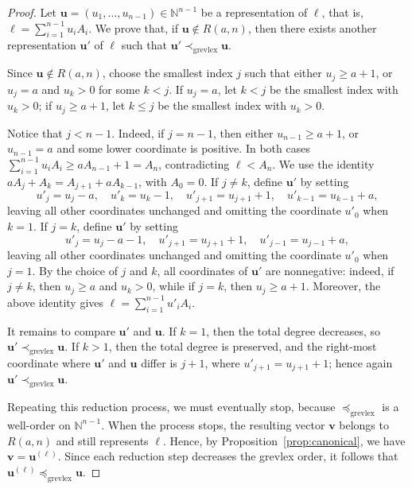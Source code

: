 \documentclass[12pt,a4paper]{amsart}
\theoremstyle{definition}
\begin{document}
\begin{proof}
Let $\mathbf{u}=(u_1,\ldots,u_{n-1})\in\mathbb{N}^{n-1}$ be a representation of $\ell$, that is, $\ell=\sum_{i=1}^{n-1}u_iA_i$. We prove that, if $\mathbf{u}\notin R(a,n)$, then there exists another representation $\mathbf{u}'$ of $\ell$ such that $\mathbf{u}'\prec_{\mathrm{grevlex}}\mathbf{u}$.

Since $\mathbf{u}\notin R(a,n)$, choose the smallest index $j$ such that
either $u_j\ge a+1$, or $u_j=a$ and $u_k>0$ for some $k<j$. If
$u_j=a$, let $k<j$ be the smallest index with $u_k>0$; if
$u_j\ge a+1$, let $k\le j$ be the smallest index with $u_k>0$.

Notice that $j<n-1$. Indeed, if $j=n-1$, then either
$u_{n-1}\ge a+1$, or $u_{n-1}=a$ and some lower coordinate is positive.
In both cases $\sum_{i=1}^{n-1}u_iA_i\ge aA_{n-1}+1=A_n$,
contradicting $\ell<A_n$.
We use the identity $aA_j+A_k=A_{j+1}+aA_{k-1}$, with $A_0=0$. If $j\ne k$, define $\mathbf{u}'$ by setting
\[
u'_j=u_j-a,\quad u'_k=u_k-1,\quad u'_{j+1}=u_{j+1}+1,\quad u'_{k-1}=u_{k-1}+a,
\]
leaving all other coordinates unchanged and omitting the coordinate $u'_0$ when $k=1$. If $j=k$, define $\mathbf{u}'$ by setting
\[
u'_j=u_j-a-1,\quad u'_{j+1}=u_{j+1}+1,\quad u'_{j-1}=u_{j-1}+a,
\]
leaving all other coordinates unchanged and omitting the coordinate $u'_0$ when $j=1$. By the choice of $j$ and $k$, all coordinates of $\mathbf{u}'$ are nonnegative: indeed, if $j\ne k$, then $u_j\ge a$ and $u_k>0$, while if $j=k$, then $u_j\ge a+1$. Moreover, the above identity gives $\ell=\sum_{i=1}^{n-1}u'_iA_i$.

It remains to compare $\mathbf{u}'$ and $\mathbf{u}$. If $k=1$, then the total degree decreases, so $\mathbf{u}'\prec_{\mathrm{grevlex}}\mathbf{u}$. If $k>1$, then the total degree is preserved, and the right-most coordinate where $\mathbf{u}'$ and $\mathbf{u}$ differ is $j+1$, where $u'_{j+1}=u_{j+1}+1$; hence again $\mathbf{u}' \prec_{\mathrm{grevlex}} \mathbf{u}$.

Repeating this reduction process, we must eventually stop, because $\preceq_{\mathrm{grevlex}}$ is a well-order on $\mathbb{N}^{n-1}$. When the process stops, the resulting vector $\mathbf{v}$ belongs to $R(a,n)$ and still represents $\ell$. Hence, by Proposition~\ref{prop:canonical}, we have $\mathbf{v}=\mathbf{u}^{(\ell)}$. Since each reduction step decreases the grevlex order, it follows that $\mathbf{u}^{(\ell)} \preceq_{\mathrm{grevlex}} \mathbf{u}$.
\end{proof}
\end{document}
